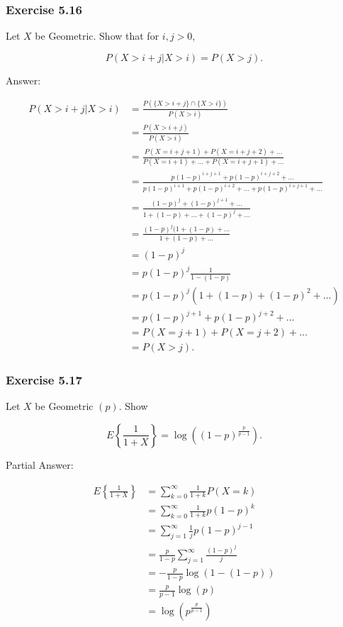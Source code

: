 \documentclass{article}
\begin{document}
{\subsubsection*{Exercise 5.16}

Let $X$ be Geometric. Show that for $i,j > 0$,

$$
P(X > i+j \vert  X > i) = P(X > j).
$$

Answer:

\begin{align*}
P(X > i+j \vert  X > i)
&= \frac{P(\{X > i+j\} \cap \{X > i\})}{P(X > i)} \\
&= \frac{P(X > i+j)}{P(X > i)} \\
&= \frac{P(X = i+j+1) + P(X = i+j + 2) + \dots }{P(X = i+1) + \dots +P(X = i+j+1) + \dots} \\
&= \frac{p(1-p)^{i+j+1} + p(1-p)^{i+j+2} + \dots }{p(1-p)^{i+1} + p(1-p)^{i+2} + \dots + p(1-p)^{i+j+1} + \dots}\\
&= \frac{(1-p)^j + (1-p)^{j+1} + \dots}{1 + (1-p) + \dots +(1-p)^j + \dots } \\
&= \frac{(1-p)^j(1 + (1-p) + \dots }{1 + (1-p) + \dots } \\
&= (1-p)^j \\
&= p(1-p)^j \frac{1}{1-(1-p)} \\
&= p(1-p)^j(1 + (1-p) + (1-p)^2 + \dots ) \\
&= p(1-p)^{j+1} + p(1-p)^{j+2} + \dots \\
&= P(X = j+1) + P(X = j+2) + \dots \\
&= P(X > j).
\end{align*}

\subsubsection*{Exercise 5.17}

Let $X$ be Geometric $(p)$. Show 

$$
E\left\lbrace\frac{1}{1+X}\right\rbrace = \log\left((1-p)^{\frac{p}{p-1}}\right).
$$

Partial Answer:

\begin{align*}
E\left\lbrace\frac{1}{1+X}\right\rbrace
&= \sum_{k = 0}^\infty \frac{1}{1+k} P\left(X = k \right) \\
&= \sum_{k=0}^\infty \frac{1}{1+k} p(1-p)^k \\
&= \sum_{j=1}^\infty \frac{1}{j}p(1-p)^{j-1} \\
&= \frac{p}{1-p}\sum_{j=1}^\infty \frac{(1-p)^j}{j} \\
&= -\frac{p}{1-p}\log(1 - (1-p)) \\
&= \frac{p}{p-1}\log(p) \\
&= \log \left(p^{\frac{p}{p-1}}\right) \\
\end{align*}





}
\end{document}

